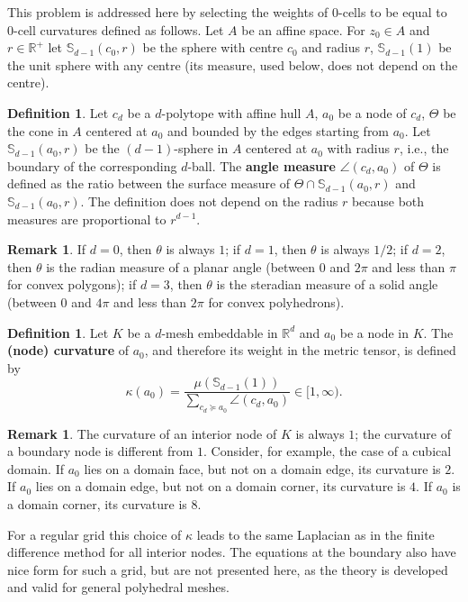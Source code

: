 \documentclass{elsarticle}
\theoremstyle{definition}
\newtheorem{definition}[theorem]{Definition}
\newtheorem{remark}[theorem]{Remark}
\newcommand{\R}{\mathbb{R}} %
\renewcommand{\S}{\mathbb{S}} %
\begin{document}
This problem is addressed here by selecting the weights of 0-cells to be equal to 0-cell curvatures defined as follows. Let $A$ be an affine space. For $z_0 \in A$ and $r \in\R^+$ let $\S_{d - 1}(c_0, r)$ be the sphere with centre $c_0$ and radius $r$, $\S_{d - 1}(1)$ be the unit sphere with any centre (its measure, used below, does not depend on the centre).
\begin{definition}
  Let $c_d$ be a $d$-polytope with affine hull $A$, $a_0$ be a node of $c_d$, $\Theta$ be the cone in $A$ centered at $a_0$ and bounded by the edges starting from $a_0$.
  Let $\S_{d - 1}(a_0, r)$ be the $(d - 1)$-sphere in $A$ centered at $a_0$ with radius $r$, i.e., the boundary of the corresponding $d$-ball. The \textbf{angle measure} $\angle(c_d, a_0)$ of $\Theta$ is defined as the ratio between the surface measure of $\Theta \cap \S_{d - 1}(a_0, r)$ and $\S_{d - 1}(a_0, r)$. The definition does not depend on the radius $r$ because both measures are proportional to $r^{d - 1}$.
\end{definition}
\begin{remark}
  If $d = 0$, then $\theta$ is always $1$; if $d = 1$, then $\theta$ is always $1 / 2$; if $d = 2$, then $\theta$ is the radian measure of a planar angle (between $0$ and $2 \pi$ and less than $\pi$ for convex polygons); if $d = 3$, then $\theta$ is the steradian measure of a solid angle (between $0$ and $4 \pi$ and less than $2 \pi$ for convex polyhedrons).
\end{remark}
\begin{definition}
  Let $K$ be a $d$-mesh embeddable in $\R^d$ and $a_0$ be a node in $K$. The \textbf{(node) curvature} of $a_0$, and therefore its weight in the metric tensor, is defined by
  \begin{equation}
    \kappa(a_0) = \frac{\mu(\S_{d - 1}(1))}{\sum_{c_d \succeq a_0} \angle(c_d, a_0)} \in [1, \infty).
  \end{equation}
\end{definition}
\begin{remark}
  The curvature of an interior node of $K$ is always $1$; the curvature of a boundary node is different from $1$. Consider, for example, the case of a cubical domain. If $a_0$ lies on a domain face, but not on a domain edge, its curvature is $2$. If $a_0$ lies on a domain edge, but not on a domain corner, its curvature is $4$. If $a_0$ is a domain corner, its curvature is $8$.
\end{remark}
For a regular grid this choice of $\kappa$ leads to the same Laplacian as in the finite difference method for all interior nodes. The equations at the boundary also have nice form for such a grid, but are not presented here, as the theory is developed and valid for general polyhedral meshes.
\end{document}
